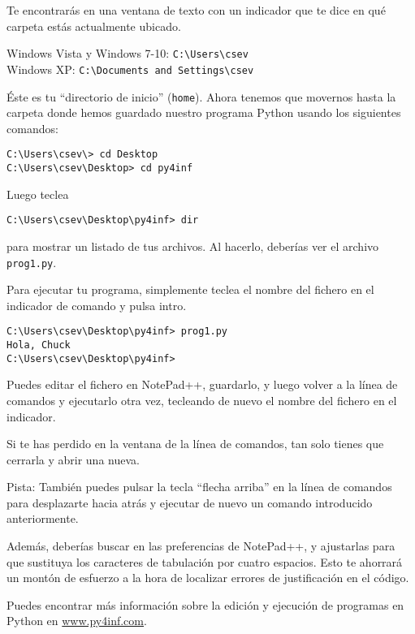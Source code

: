 Te encontrarás en una ventana de texto con un indicador que
te dice en qué carpeta estás actualmente ubicado.

Windows Vista y Windows 7-10: {\tt C:{\textbackslash}Users{\textbackslash}csev}\\
Windows XP: {\tt C:{\textbackslash}Documents and Settings{\textbackslash}csev}

Éste es tu ``directorio de inicio'' ({\tt home}). Ahora tenemos que movernos hasta
la carpeta donde hemos guardado nuestro programa Python usando
los siguientes comandos:

\beforeverb
\begin{verbatim}
C:\Users\csev\> cd Desktop
C:\Users\csev\Desktop> cd py4inf
\end{verbatim}
\afterverb
%
Luego teclea

\beforeverb
\begin{verbatim}
C:\Users\csev\Desktop\py4inf> dir 
\end{verbatim}
\afterverb
%
para mostrar un listado de tus archivos. Al hacerlo, 
deberías ver el archivo {\tt prog1.py}.

Para ejecutar tu programa, simplemente teclea el nombre del fichero en
el indicador de comando y pulsa intro.

\beforeverb
\begin{verbatim}
C:\Users\csev\Desktop\py4inf> prog1.py
Hola, Chuck
C:\Users\csev\Desktop\py4inf> 
\end{verbatim}
\afterverb
%
Puedes editar el fichero en NotePad++, guardarlo, y luego volver
a la línea de comandos y ejecutarlo otra vez, tecleando de nuevo
el nombre del fichero en el indicador.

Si te has perdido en la ventana de la línea de comandos, tan solo tienes
que cerrarla y abrir una nueva.

Pista: También puedes pulsar la tecla ``flecha arriba'' en la línea de comandos para
desplazarte hacia atrás y ejecutar de nuevo un comando introducido anteriormente.

Además, deberías buscar en las preferencias de NotePad++, y ajustarlas para
que sustituya los caracteres de tabulación por cuatro espacios. Esto te ahorrará
un montón de esfuerzo a la hora de localizar errores de justificación en el código.

Puedes encontrar más información sobre la edición y ejecución de
programas en Python en \url{www.py4inf.com}.

